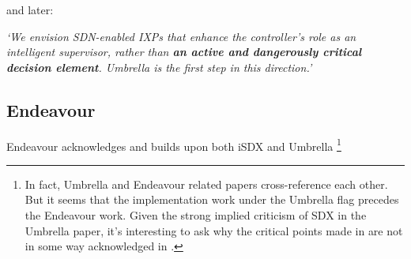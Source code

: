 and later:


\textit{`We envision SDN-enabled IXPs that enhance the controller’s role as an intelligent supervisor, rather than \textbf{an active and dangerously critical decision element}.
Umbrella is the first step in this direction.'}


\subsection{Endeavour}
Endeavour \cite{Antichi2017} acknowledges and builds upon both iSDX and Umbrella \cite{Bruyere2018} \footnote{In fact, Umbrella and Endeavour related papers cross-reference each other.  But it seems that the implementation work under the Umbrella flag precedes the Endeavour work.  Given the strong implied criticism of SDX in the Umbrella paper, it's interesting to ask why the critical points made in \cite{Bruyere2018} are not in some way acknowledged in  \cite{Antichi2017}. }






